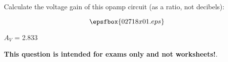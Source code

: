 

Calculate the voltage gain of this opamp circuit (as a ratio, not decibels):

$$\epsfbox{02718x01.eps}$$







$A_V$ = 2.833







{\bf This question is intended for exams only and not worksheets!}.




